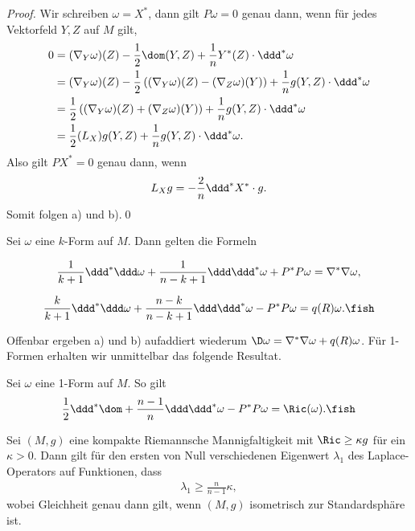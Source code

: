 \documentclass[%
	paper=a5,%
	fleqn,%
	DIV=18,%
	BCOR=0mm,
	fontsize=11pt,
	titlepage=false,%
	bibliography=totoc,
	DIV=18,%
	twoside=true,
	pdftitle=Riemannsche Geometrie,
	pdfauthor=Uwe Semmelmann,
	numbers=noendperiod]%
	{scrbook}
\begin{document}
\begin{proof}
Wir schreiben $\omega = X^*$, dann gilt $P\omega = 0$ genau dann, wenn für jedes Vektorfeld $Y,Z$ auf $M$ gilt,
\begin{align*}
0 &=  (\nabla_{Y}\omega)(Z) - \frac{1}{2}\dom(Y,Z) + \frac{1}{n} Y^*(Z) \cdot \ddd^*\omega\\
&= (\nabla_{Y}\omega)(Z) - \frac{1}{2}\left( (\nabla_{Y}\omega)(Z) - (\nabla_{Z}\omega)(Y) \right) + \frac{1}{n} g(Y,Z) \cdot \ddd^*\omega\\
&= \frac{1}{2}\left( (\nabla_{Y}\omega)(Z) + (\nabla_{Z}\omega)(Y) \right) + \frac{1}{n} g(Y,Z) \cdot \ddd^*\omega\\
&= \frac{1}{2}(L_{X})g(Y,Z) + \frac{1}{n} g(Y,Z) \cdot \ddd^*\omega.
\end{align*}
Also gilt $PX^* = 0$ genau dann, wenn
\begin{align*}
L_{X}g = -\frac{2}{n}\ddd^*X^*\cdot g.
\end{align*}
Somit folgen a) und b).\qed
\end{proof}

\begin{prop}
Sei $\omega$ eine $k$-Form auf $M$. Dann gelten die Formeln
\begin{propenum}
\item 
\[
\frac{1}{k+1}\ddd^*\ddd\omega + \frac{1}{n-k+1}\ddd\ddd^*\omega + P^*P\omega = \nabla^*\nabla\omega,
\]
\item 
\[
\frac{k}{k+1}\ddd^*\ddd\omega + \frac{n-k}{n-k+1}\ddd\ddd^*\omega - P^*P\omega = q(R)\omega.\fish
\]
\end{propenum}
\end{prop}
Offenbar ergeben a) und b) aufaddiert wiederum $\D\omega = \nabla^*\nabla\omega + q(R)\omega$. Für 1-Formen erhalten wir unmittelbar das folgende Resultat.

\begin{cor}
Sei $\omega$ eine 1-Form auf $M$. So gilt
\begin{align*}
\frac{1}{2}\ddd^*\dom + \frac{n-1}{n}\ddd\ddd^*\omega - P^*P\omega = \Ric(\omega).\fish
\end{align*}
\end{cor}

\begin{cor}
Sei $(M,g)$ eine kompakte Riemannsche Mannigfaltigkeit mit $\Ric \ge \kappa g$ für ein $\kappa > 0$. Dann gilt für den ersten von Null verschiedenen Eigenwert $\lambda_{1}$ des Laplace-Operators auf Funktionen, dass
\begin{align*}
\lambda_{1} \ge \frac{n}{n-1}\kappa,
\end{align*}
wobei Gleichheit genau dann gilt, wenn $(M,g)$ isometrisch zur Standardsphäre ist.~\fish
\end{cor}
\end{document}

